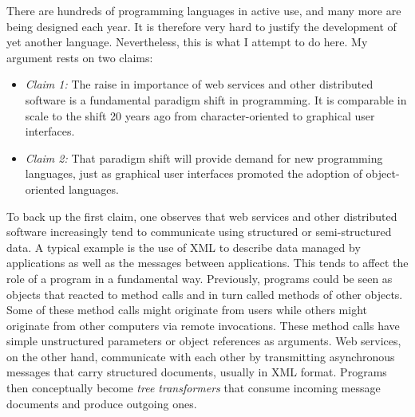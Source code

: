 There are hundreds of programming languages in active use, and many more are
being designed each year. It is therefore very hard to justify the development
of yet another language. Nevertheless, this is what I attempt to do here. My
argument rests on two claims:
\begin{itemize}
\item[] {\em Claim 1:} The raise in importance of web services and
other distributed software is a fundamental paradigm
shift in programming. It is comparable in scale to the shift 20 years ago
from character-oriented to graphical user interfaces.
\item[] {\em Claim 2:} That paradigm shift will provide demand
for new programming languages, just as graphical user interfaces
promoted the adoption of object-oriented languages.
\end{itemize}
To back up the first claim, one observes that web services and other
distributed software increasingly tend to communicate using structured or
semi-structured data. A typical example is the use of XML to describe data
managed by applications as well as the messages between applications. This
tends to affect the role of a program in a fundamental way. Previously,
programs could be seen as objects that reacted to method calls and in turn
called methods of other objects. Some of these method calls might originate
from users while others might originate from other computers via remote
invocations.  These method calls have simple unstructured parameters or object
references as arguments.  Web services, on the other hand, communicate with
each other by transmitting asynchronous messages that carry structured
documents, usually in XML format. Programs then conceptually become {\em tree
transformers} that consume incoming message documents and produce outgoing
ones.

